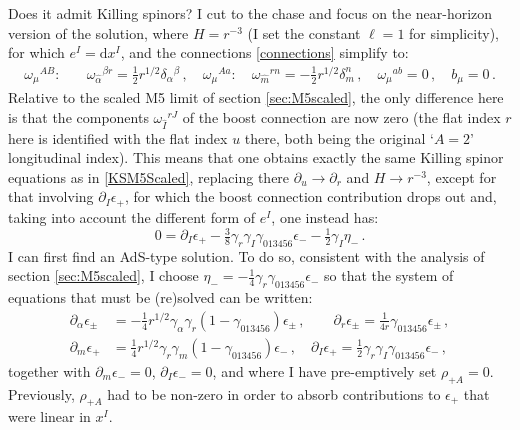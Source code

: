 \documentclass[11pt]{article}
\newcommand{\be}{\begin{equation}}
\newcommand{\ee}{\end{equation}}
\newcommand{\dd}{\mathrm{d}}
\numberwithin{equation}{section}
\begin{document}
{{Does it admit Killing spinors?
I cut to the chase and focus on the near-horizon version of the solution, where $H = r^{-3}$ (I set the constant $\ell=1$ for simplicity), for which $e^I = \dd x^I$, and the connections \eqref{connections} simplify to:
\begin{subequations}
\begin{align}
 \omega_\mu{}^{AB} :\quad &  \omega_{\hat \alpha}{}^{\beta r} = \tfrac12 r^{1/2} \delta_\alpha{}^\beta \,,\quad
   \omega_\mu{}^{Aa} :\quad   \omega_{\hat m}{}^{r n} = - \tfrac12 r^{1/2}  \delta_m^n \,,\quad   \omega_\mu{}^{ab}  =  0 \,,\quad b_{\mu} = 0 \,.
\end{align}
\end{subequations}
Relative to the scaled M5 limit of section \ref{sec:M5scaled}, the only difference here is that the components $\omega_{\hat I}{}^{r J}$ of the boost connection are now zero (the flat index $r$ here is identified with the flat index $u$ there, both being the original `$A=2$' longitudinal index).
This means that one obtains exactly the same Killing spinor equations as in \eqref{KSM5Scaled}, replacing there $\partial_u \rightarrow \partial_r$ and $H\rightarrow r^{-3}$, except for that involving $\partial_I \epsilon_+$, for which the boost connection contribution drops out and, taking into account the different form of $e^I$, one instead has:
\be
0  = \partial_I \epsilon_+  - \tfrac{3}{8} \gamma_r \gamma_I \gamma_{013456} \epsilon_- 
-\tfrac12 \gamma_I \eta_- \,.\label{KSepsplusIr}
\ee
I can first find an AdS-type solution.
To do so, consistent with the analysis of section \ref{sec:M5scaled}, I choose $\eta_- = - \tfrac14 \gamma_r \gamma_{013456} \epsilon_-$ so that the system of equations that must be (re)solved can be written:
\begin{subequations}
\label{KSM5Polar}
\begin{align}
\partial_\alpha \epsilon_{\pm} &	= - \tfrac{1}{4} r^{1/2} \gamma_\alpha \gamma_r ( 1 -  \gamma_{013456}) \epsilon_{\pm} \,,
\qquad 
\partial_r \epsilon_{\pm} = \tfrac{1}{4r} \gamma_{013456} \epsilon_{\pm} \,,\\[4pt]
\partial_m \epsilon_+ & = \tfrac14 r^{1/2} \gamma_r \gamma_m ( 1 -  \gamma_{013456}) \epsilon_-\,, \quad 
\partial_I \epsilon_+  = \tfrac12 \gamma_r \gamma_I \gamma_{013456} \epsilon_- \,,
\end{align} 
\end{subequations}
together with $\partial_m \epsilon_- = 0$, $\partial_I \epsilon_- = 0$, and where I have pre-emptively set $\rho_{+A} = 0$.
Previously, $\rho_{+A}$ had to be non-zero in order to absorb contributions to $\epsilon_+$ that were linear in $x^I$.
}}
\end{document}
